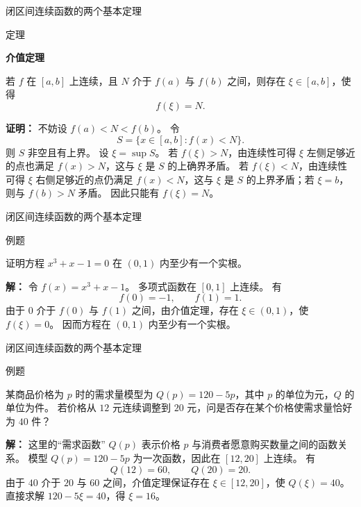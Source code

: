 \documentclass[aspectratio=169,10pt,fontset=fandol]{ctexbeamer}
\begin{document}
\begin{frame}[t,fragile]{闭区间连续函数的两个基本定理}
\footnotesize
\begin{block}{定理}
{\footnotesize
\textbf{介值定理}\par

若 $f$ 在 $[a,b]$ 上连续，且 $N$ 介于 $f(a)$ 与 $f(b)$ 之间，则存在 $\xi\in[a,b]$，使得
\[
f(\xi)=N.
\]

}
\end{block}
\pause
{\footnotesize
\textbf{证明：}
不妨设 $f(a)<N<f(b)$。 令
\[
S=\{x\in[a,b]:f(x)<N\}.
\]
则 $S$ 非空且有上界。 设 $\xi=\sup S$。 若 $f(\xi)>N$，由连续性可得 $\xi$ 左侧足够近的点也满足 $f(x)>N$，这与 $\xi$ 是 $S$ 的上确界矛盾。 若 $f(\xi)<N$，由连续性可得 $\xi$ 右侧足够近的点仍满足 $f(x)<N$，这与 $\xi$ 是 $S$ 的上界矛盾；若 $\xi=b$，则与 $f(b)>N$ 矛盾。 因此只能有 $f(\xi)=N$。

}
\end{frame}
\begin{frame}[t,fragile]{闭区间连续函数的两个基本定理}
\footnotesize
\begin{block}{例题}
{\footnotesize
证明方程 $x^3+x-1=0$ 在 $(0,1)$ 内至少有一个实根。

}
\end{block}
\pause
{\footnotesize
\textbf{解：}
令 $f(x)=x^3+x-1$。 多项式函数在 $[0,1]$ 上连续。 有
\[
f(0)=-1,\qquad f(1)=1.
\]
由于 $0$ 介于 $f(0)$ 与 $f(1)$ 之间，由介值定理，存在 $\xi\in(0,1)$，使 $f(\xi)=0$。 因而方程在 $(0,1)$ 内至少有一个实根。

}
\end{frame}
\begin{frame}[t,fragile]{闭区间连续函数的两个基本定理}
\footnotesize
\begin{block}{例题}
{\footnotesize
某商品价格为 $p$ 时的需求量模型为 $Q(p)=120-5p$，其中 $p$ 的单位为元，$Q$ 的单位为件。 若价格从 $12$ 元连续调整到 $20$ 元，问是否存在某个价格使需求量恰好为 $40$ 件？

}
\end{block}
\pause
{\footnotesize
\textbf{解：}
这里的“需求函数” $Q(p)$ 表示价格 $p$ 与消费者愿意购买数量之间的函数关系。 模型 $Q(p)=120-5p$ 为一次函数，因此在 $[12,20]$ 上连续。 有
\[
Q(12)=60,\qquad Q(20)=20.
\]
由于 $40$ 介于 $20$ 与 $60$ 之间，介值定理保证存在 $\xi\in[12,20]$，使 $Q(\xi)=40$。 直接求解 $120-5\xi=40$，得 $\xi=16$。

}
\end{frame}
\end{document}
